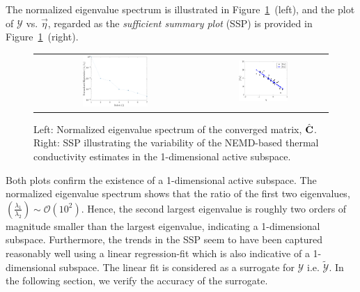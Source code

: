The normalized eigenvalue spectrum is illustrated
in Figure~\ref{fig:casfig2}~(left), and the plot of $\mathcal{Y}$ vs. $\vec\eta$, regarded as the \textit{sufficient
summary plot} (SSP) is provided in Figure~\ref{fig:casfig2}~(right). 
%
\begin{figure}[htbp]
\begin{center}
\begin{tabular}{cc}
  \includegraphics[width=0.42\textwidth]{./Figures/eig_spec}
  &
  \hspace{3mm}
  \includegraphics[width=0.4\textwidth]{./Figures/free_ssp1D}
  \end{tabular}
\caption{Left: Normalized eigenvalue spectrum of the converged matrix, $\hat{\mathbf{{C}}}$. Right: SSP
illustrating the variability of the NEMD-based thermal conductivity estimates in the 1-dimensional
active subspace.}
\label{fig:casfig2}
\end{center}
\end{figure}
%
Both plots confirm the existence of a 1-dimensional active subspace. The normalized eigenvalue spectrum
shows that the ratio of the first two eigenvalues, $\left(\frac{\lambda_1}{\lambda_2}\right)\sim\mathcal{O}(10^2)$.
Hence, the second largest eigenvalue is roughly two orders of magnitude smaller than the largest eigenvalue,
indicating a 1-dimensional subspace. Furthermore, the trends in the SSP seem to have been captured
reasonably well using a linear regression-fit which is also indicative of a 1-dimensional subspace. The linear 
fit is considered as a surrogate for $\mathcal{Y}$ i.e. $\tilde{\mathcal{Y}}$. In the following section, 
we verify the accuracy of the
surrogate. 


